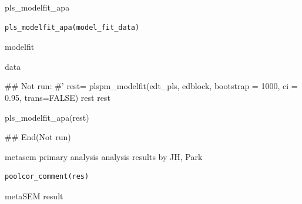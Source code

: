 \documentclass[a4paper]{book}
\begin{document}
%
\begin{Description}
pls\_modelfit\_apa
\end{Description}
%
\begin{Usage}
\begin{verbatim}
pls_modelfit_apa(model_fit_data)
\end{verbatim}
\end{Usage}
%
\begin{Arguments}
\begin{ldescription}
\item[\code{model\_fit\_data}] modelfit
\end{ldescription}
\end{Arguments}
%
\begin{Value}
data
\end{Value}
%
\begin{Examples}
\begin{ExampleCode}

## Not run: 
#'
rest= plspm_modelfit(edt_pls, edblock, bootstrap = 1000, ci = 0.95, trans=FALSE)
rest
rest%

pls_modelfit_apa(rest)


## End(Not run)
\end{ExampleCode}
\end{Examples}
%
\begin{Description}
metasem primary analysis analysis results by JH, Park
\end{Description}
%
\begin{Usage}
\begin{verbatim}
poolcor_comment(res)
\end{verbatim}
\end{Usage}
%
\begin{Arguments}
\begin{ldescription}
\item[\code{res}] metaSEM result
\end{ldescription}
\end{Arguments}
%
\end{document}
